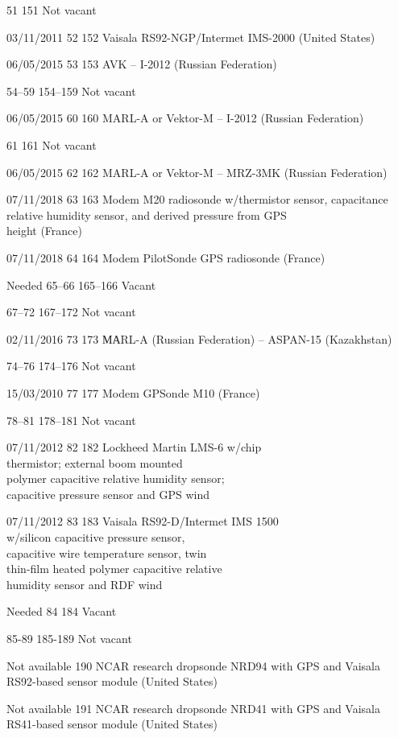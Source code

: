 51 151 Not vacant

03/11/2011 52 152 Vaisala RS92-NGP/Intermet IMS-2000 (United States)

06/05/2015 53 153 AVK -- I-2012 (Russian Federation)

54--59 154--159 Not vacant

06/05/2015 60 160 MARL-A or Vektor-M -- I-2012 (Russian Federation)

61 161 Not vacant

06/05/2015 62 162 MARL-A or Vektor-M -- MRZ-3MK (Russian Federation)

07/11/2018 63 163 Modem M20 radiosonde w/thermistor sensor, capacitance\\
relative humidity sensor, and derived pressure from GPS\\
height (France)

07/11/2018 64 164 Modem PilotSonde GPS radiosonde (France)

Needed 65--66 165--166 Vacant

67--72 167--172 Not vacant

02/11/2016 73 173 МАRL-A (Russian Federation) -- ASPAN-15 (Kazakhstan)

74--76 174--176 Not vacant

15/03/2010 77 177 Modem GPSonde M10 (France)

78--81 178--181 Not vacant

07/11/2012 82 182 Lockheed Martin LMS-6 w/chip\\
thermistor; external boom mounted\\
polymer capacitive relative humidity sensor;\\
capacitive pressure sensor and GPS wind

07/11/2012 83 183 Vaisala RS92-D/Intermet IMS 1500\\
w/silicon capacitive pressure sensor,\\
capacitive wire temperature sensor, twin\\
thin-film heated polymer capacitive relative\\
humidity sensor and RDF wind

Needed 84 184 Vacant

85-89 185-189 Not vacant

Not available 190 NCAR research dropsonde NRD94 with GPS and Vaisala\\
RS92-based sensor module (United States)

Not available 191 NCAR research dropsonde NRD41 with GPS and Vaisala\\
RS41-based sensor module (United States)

